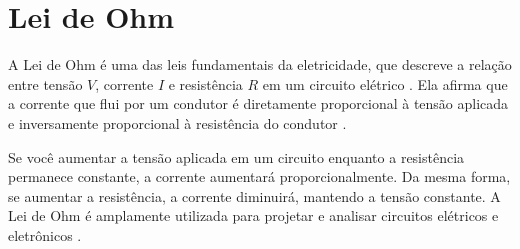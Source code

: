 \documentclass[12pt,a4paper]{article} %
\begin{document}
\section*{Lei de Ohm}

\begin{justify}

\hspace{0.5cm}A Lei de Ohm é uma das leis fundamentais da eletricidade, que descreve a relação entre tensão $V$, corrente $I$ e resistência $R$ em um circuito elétrico \cite{ufs2016}. Ela afirma que a corrente que flui por um condutor é diretamente proporcional à tensão aplicada e inversamente proporcional à resistência do condutor \cite{sadiku2015}.

Se você aumentar a tensão aplicada em um circuito enquanto a resistência permanece constante, a corrente aumentará proporcionalmente. Da mesma forma, se aumentar a resistência, a corrente diminuirá, mantendo a tensão constante. A Lei de Ohm é amplamente utilizada para projetar e analisar circuitos elétricos e eletrônicos \cite{boylestad2016}.
\end{justify}

\newpage 

\end{document}
